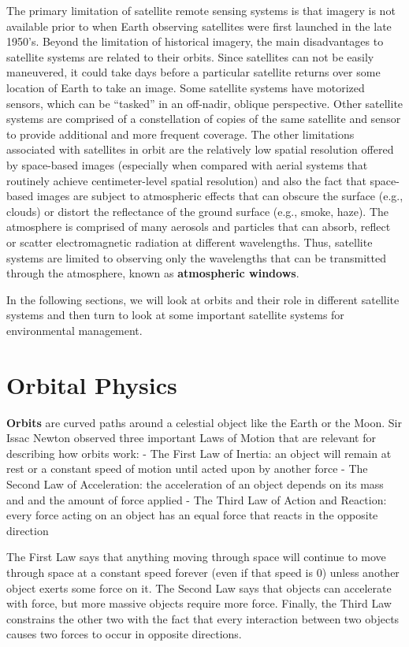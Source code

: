 \documentclass[
]{book}
\begin{document}
The primary limitation of satellite remote sensing systems is that imagery is not available prior to when Earth observing satellites were first launched in the late 1950's. Beyond the limitation of historical imagery, the main disadvantages to satellite systems are related to their orbits. Since satellites can not be easily maneuvered, it could take days before a particular satellite returns over some location of Earth to take an image. Some satellite systems have motorized sensors, which can be ``tasked'' in an off-nadir, oblique perspective. Other satellite systems are comprised of a constellation of copies of the same satellite and sensor to provide additional and more frequent coverage. The other limitations associated with satellites in orbit are the relatively low spatial resolution offered by space-based images (especially when compared with aerial systems that routinely achieve centimeter-level spatial resolution) and also the fact that space-based images are subject to atmospheric effects that can obscure the surface (e.g., clouds) or distort the reflectance of the ground surface (e.g., smoke, haze). The atmosphere is comprised of many aerosols and particles that can absorb, reflect or scatter electromagnetic radiation at different wavelengths. Thus, satellite systems are limited to observing only the wavelengths that can be transmitted through the atmosphere, known as \textbf{atmospheric windows}.

In the following sections, we will look at orbits and their role in different satellite systems and then turn to look at some important satellite systems for environmental management.

\section{Orbital Physics}\label{orbital-physics}

\textbf{Orbits} are curved paths around a celestial object like the Earth or the Moon. Sir Issac Newton observed three important Laws of Motion that are relevant for describing how orbits work:
- The First Law of Inertia: an object will remain at rest or a constant speed of motion until acted upon by another force
- The Second Law of Acceleration: the acceleration of an object depends on its mass and and the amount of force applied
- The Third Law of Action and Reaction: every force acting on an object has an equal force that reacts in the opposite direction

The First Law says that anything moving through space will continue to move through space at a constant speed forever (even if that speed is 0) unless another object exerts some force on it. The Second Law says that objects can accelerate with force, but more massive objects require more force. Finally, the Third Law constrains the other two with the fact that every interaction between two objects causes two forces to occur in opposite directions.
\end{document}
